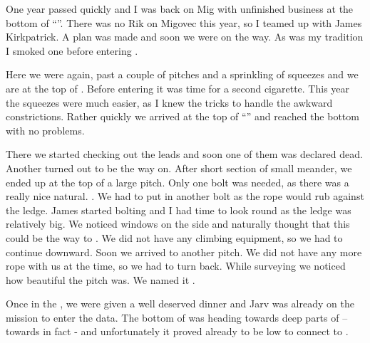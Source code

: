 One year passed quickly and I was back on Mig with unfinished business at the bottom of ``''. There was no Rik on Migovec this year, so I teamed up with James Kirkpatrick. A plan was made and soon we were on the way. As was my tradition I smoked one before entering .

Here we were again, past a couple of pitches and a sprinkling of squeezes and we are at the top of . Before entering  it was time for a second cigarette. This year the squeezes were much easier, as I knew the tricks to handle the
awkward constrictions. Rather quickly we arrived at the top of ``'' and reached the bottom with no problems.

There we started checking out the leads and soon one of them was declared dead. Another turned out to be the way on. After short section of small meander, we ended up at the top of a large pitch. Only one bolt was needed, as there was a really nice natural. . We had to put in another bolt as the rope would rub against the ledge. James started bolting and I had time to look round as
the ledge was relatively big. We noticed windows on the side and naturally thought that this could be the way to . We did not have any climbing equipment, so we had to continue downward. Soon we arrived to another pitch. We did not have any more rope with us at the
time, so we had to turn back. While surveying we noticed how beautiful the pitch was. We named it .

Once in the , we were given a well deserved dinner and Jarv was
already on the mission to enter the data. The bottom of  was heading towards deep parts of  --
towards  in fact - and unfortunately it proved
already to be low to connect to .



